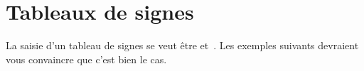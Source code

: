 \documentclass[10pt, a4paper]{article}
\begin{document}
\section{Tableaux de signes}

La saisie d'un tableau de signes se veut être  et \,. Les exemples suivants devraient vous convaincre que c'est bien le cas.
\end{document}
